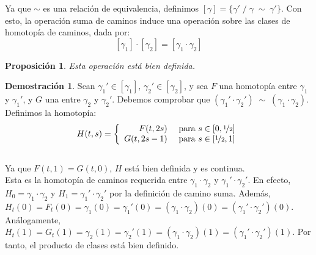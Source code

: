 \documentclass[12pt,twoside]{report}
\theoremstyle{azul}
\theoremstyle{azul2}
\theoremstyle{plain}
\newtheorem*{prop}{Proposición}
\theoremstyle{definition}
\newtheorem*{dem}{Demostración}
\theoremstyle{remark}
\begin{document}
Ya que $\sim$ es una relación de equivalencia, definimos $[\gamma] = \{\gamma' \; / \; \gamma \;\sim\; \gamma'\}$. Con esto, la operación suma de caminos induce una operación sobre las clases de homotopía de caminos, dada por: $$[\gamma_1] \cdot [\gamma_2] = [\gamma_1 \cdot \gamma_2]$$

\begin{prop}
Esta operación está bien definida.
\end{prop}
\begin{dem}
Sean $\gamma_1' \in [\gamma_1],\, \gamma_2' \in [\gamma_2]$, y sea $F$ una homotopía entre $\gamma_1$ y $\gamma_1'$, y $G$ una entre $\gamma_2$ y $\gamma_2'$. Debemos comprobar que $(\gamma_1' \cdot \gamma_2') \;\sim\; (\gamma_1 \cdot \gamma_2)$. Definimos la homotopía:
$$H(t,s)=\left\{ \begin{array}{rl}
         F(t,2s) & \text{ para } s \in [0,\nicefrac{1}{2}] \\
         G(t,2s-1) & \text{ para } s \in [\nicefrac{1}{2},1]  
    \end{array} \right.$$  \\\vspace{5mm} 
Ya que $F(t,1) = G(t,0)$, $H$ está bien definida y es continua.\\
Esta es la homotopía de caminos requerida entre $\gamma_1 \cdot \gamma_2$ y $\gamma_1' \cdot \gamma_2'$. En efecto, $H_0 = \gamma_1 \cdot \gamma_2$ y $H_1 = \gamma_1' \cdot \gamma_2'$ por la definición de camino suma. Además, $H_t(0) = F_t(0) = \gamma_1(0) = \gamma_1'(0) = (\gamma_1 \cdot \gamma_2)(0) = (\gamma_1' \cdot \gamma_2')(0)$. Análogamente, $H_t(1) = G_t(1) = \gamma_2(1) = \gamma_2'(1) = (\gamma_1 \cdot \gamma_2)(1) = (\gamma_1' \cdot \gamma_2')(1)$. Por tanto, el producto de clases está bien definido.
\end{dem}
\end{document}
